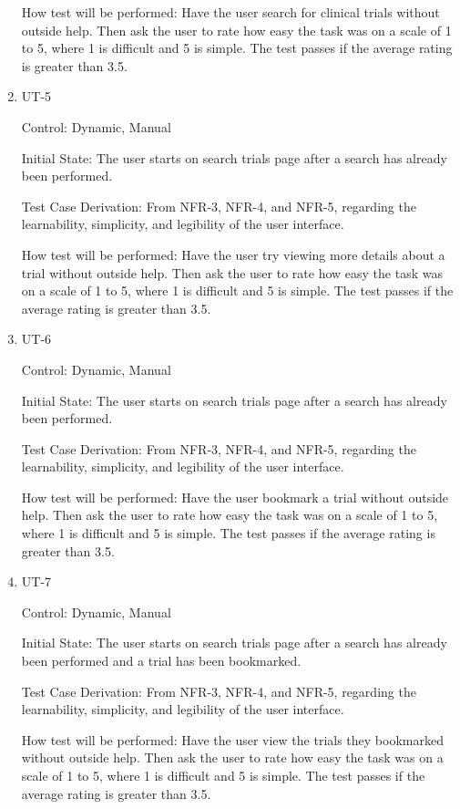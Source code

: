 \documentclass[12pt, titlepage]{article}
\begin{document}
\begin{enumerate}
How test will be performed: Have the user search for clinical trials without outside help. Then ask the user to 
rate how easy the task was on a scale of 1 to 5, where 1 is difficult and 5 is simple. The test passes if the average 
rating is greater than 3.5.

\item{UT-5}

Control: Dynamic, Manual
					
Initial State: The user starts on search trials page after a search has already been performed.

Test Case Derivation: From NFR-3, NFR-4, and NFR-5, regarding the learnability, simplicity, and legibility of the user interface.

How test will be performed: Have the user try viewing more details about a trial without outside help. Then ask the user to 
rate how easy the task was on a scale of 1 to 5, where 1 is difficult and 5 is simple. The test passes if the average 
rating is greater than 3.5.

\item{UT-6}

Control: Dynamic, Manual
					
Initial State: The user starts on search trials page after a search has already been performed.

Test Case Derivation: From NFR-3, NFR-4, and NFR-5, regarding the learnability, simplicity, and legibility of the user interface.

How test will be performed: Have the user bookmark a trial without outside help. Then ask the user to 
rate how easy the task was on a scale of 1 to 5, where 1 is difficult and 5 is simple. The test passes if the average 
rating is greater than 3.5.

\item{UT-7}

Control: Dynamic, Manual
					
Initial State: The user starts on search trials page after a search has already been performed and a trial has been bookmarked.

Test Case Derivation: From NFR-3, NFR-4, and NFR-5, regarding the learnability, simplicity, and legibility of the user interface.

How test will be performed: Have the user view the trials they bookmarked without outside help. Then ask the user to 
rate how easy the task was on a scale of 1 to 5, where 1 is difficult and 5 is simple. The test passes if the average 
rating is greater than 3.5.


\end{enumerate}
\end{document}
